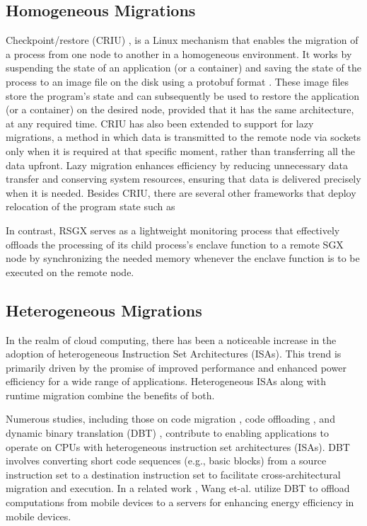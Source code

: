 \documentclass[article, doublespace,nopageskip]{VTthesis} %
\newcommand{\monitor}{RSGX \xspace}
\begin{document}
    \subsection{Homogeneous Migrations}
    Checkpoint/restore (CRIU) \cite{CRIU}, is a Linux mechanism that enables the migration of a process from one node to another in a homogeneous environment. It works by suspending the state of an application (or a container) and saving the state of the process to an image file on the disk using a protobuf format \cite{Protobuf}. These image files store the program's state and can subsequently be used to restore the application (or a container) on the desired node, provided that it has the same architecture, at any required time. CRIU has also been extended to support for lazy migrations, a method in which data is transmitted to the remote node via sockets only when it is required at that specific moment, rather than transferring all the data upfront. Lazy migration enhances efficiency by reducing unnecessary data transfer and conserving system resources, ensuring that data is delivered precisely when it is needed. Besides CRIU, there are several other frameworks that deploy relocation of the program state such as \cite{migration:wiki} 

    In contrast, \monitor serves as a lightweight monitoring process that effectively offloads the processing of its child process's enclave function to a remote SGX node by synchronizing the needed memory whenever the enclave function is to be executed on the remote node.

    \subsection{Heterogeneous Migrations}
    In the realm of cloud computing, there has been a noticeable increase in the adoption of heterogeneous Instruction Set Architectures (ISAs). This trend is primarily driven by the promise of improved performance and enhanced power efficiency for a wide range of applications. Heterogeneous ISAs along with runtime migration combine the benefits of both. 
    
    Numerous studies, including those on code migration \cite{hcontainer, het_isa_migrate:asplos12}, code offloading \cite{offload:mobisys17}, and dynamic binary translation (DBT) \cite{dbt:tc01}, contribute to enabling applications to operate on CPUs with heterogeneous instruction set architectures (ISAs). DBT involves converting short code sequences (e.g., basic blocks) from a source instruction set to a destination instruction set to facilitate cross-architectural migration and execution. In a related work \cite{offload:mobisys17}, Wang et-al. utilize DBT to offload computations from mobile devices to a servers for enhancing energy efficiency in mobile devices.
\end{document}
